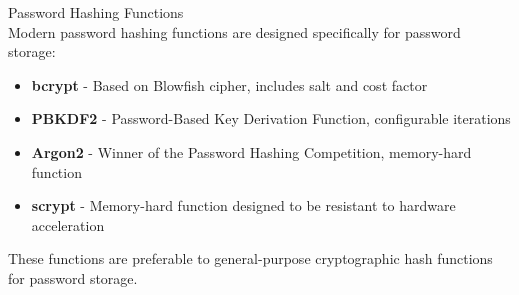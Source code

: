 \begin{theorem}{Password Hashing Functions}\\
Modern password hashing functions are designed specifically for password storage:
\begin{itemize}
    \item \textbf{bcrypt} - Based on Blowfish cipher, includes salt and cost factor
    \item \textbf{PBKDF2} - Password-Based Key Derivation Function, configurable iterations
    \item \textbf{Argon2} - Winner of the Password Hashing Competition, memory-hard function
    \item \textbf{scrypt} - Memory-hard function designed to be resistant to hardware acceleration
\end{itemize}
These functions are preferable to general-purpose cryptographic hash functions for password storage.
\end{theorem}

